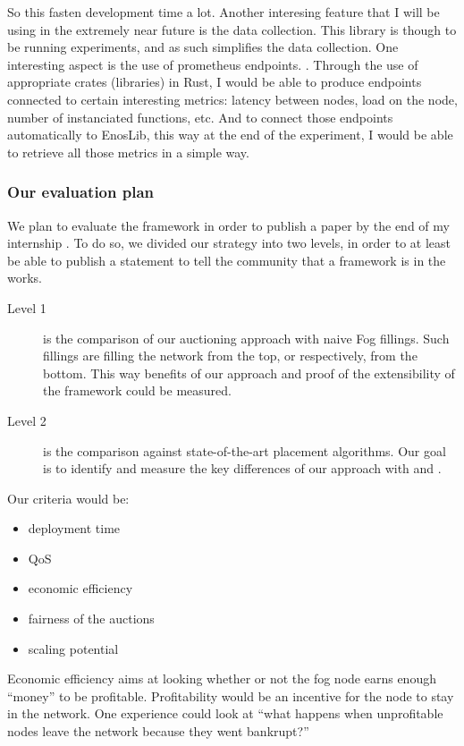 \documentclass[11pt]{sdm}
\begin{document}
So this fasten development time a lot. Another interesing feature that I will be using in the extremely near future is the data collection. This library is though to be running experiments, and as such simplifies the data collection. One interesting aspect is the use of prometheus endpoints. . Through the use of appropriate crates (libraries) in Rust, I would be able to produce endpoints connected to certain interesting metrics: latency between nodes, load on the node, number of instanciated functions, etc. And to connect those endpoints automatically to EnosLib, this way at the end of the experiment, I would be able to retrieve all those metrics in a simple way.


\subsubsection{Our evaluation plan}

We plan to evaluate the framework in order to publish a paper by the end of my internship . To do so, we divided our strategy into two levels, in order to at least be able to publish a statement to tell the community that a framework is in the works.

\begin{description}
	\item[Level 1]{is the comparison of our auctioning approach with naive Fog fillings. Such fillings are filling the network from the top, or respectively, from the bottom. This way benefits of our approach and proof of the extensibility of the framework could be measured.}
	\item[Level 2]{ is the comparison against state-of-the-art placement algorithms. Our goal is to identify and measure the key differences of our approach with \cite{bermbach_auctionwhisk_2022} and \cite{tasiopoulos_fogspot_2021}.}
\end{description}

Our criteria would be:
\begin{itemize}
	\item deployment time
	\item \gls{QoS}
	\item economic efficiency
	\item fairness of the auctions
	\item scaling potential
\end{itemize}

Economic efficiency aims at looking whether or not the fog node earns enough “money” to be profitable. Profitability would be an incentive for the node to stay in the network. One experience could look at “what happens when unprofitable nodes leave the network because they went bankrupt?”
\end{document}
